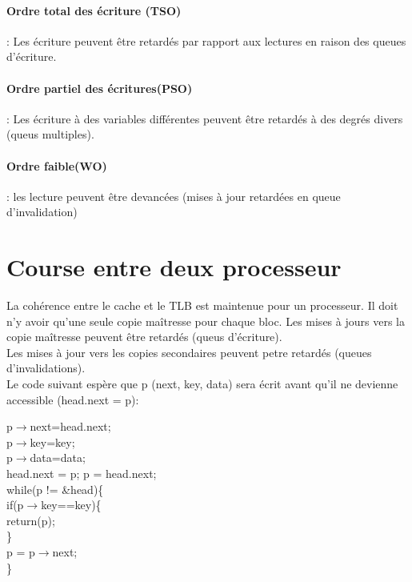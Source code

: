 \documentclass[oneside]{book}
\begin{document}
\paragraph{Ordre total des écriture (TSO)}: Les écriture peuvent être retardés par rapport aux lectures en raison des queues d'écriture. 

\paragraph{Ordre partiel des écritures(PSO)}: Les écriture à des variables différentes peuvent être retardés à des degrés divers (queus multiples).

\paragraph{Ordre faible(WO)}: les lecture peuvent être devancées (mises à jour retardées en queue d'invalidation) 

\section{Course entre deux processeur}
La cohérence entre le cache et le TLB est maintenue pour un processeur. Il doit n'y avoir qu'une seule copie maîtresse pour chaque bloc. Les mises à jours vers la copie maîtresse peuvent être retardés (queus d'écriture).\\

Les mises à jour vers les copies secondaires peuvent petre retardés (queues d'invalidations).\\

Le code suivant espère que p (next, key, data) sera écrit avant qu'il ne devienne accessible (head.next = p):

\begin{multicols}{2}
p$\rightarrow$next=head.next;\\
p$\rightarrow$key=key;\\
p$\rightarrow$data=data;\\

head.next = p;
\columnbreak
p = head.next;\\
while(p != \&head)\{\\
	if(p$\rightarrow$key==key)\{\\
		return(p);\\
	\}\\
	p = p$\rightarrow$next;\\
\}
\end{multicols}
\end{document}
